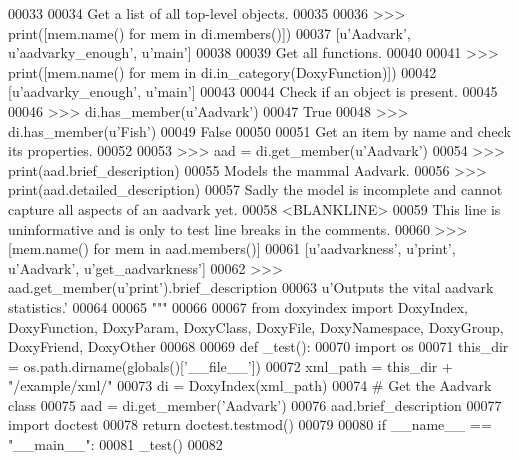 \begin{DoxyCode}
00033 \textcolor{stringliteral}{}
00034 \textcolor{stringliteral}{Get a list of all top-level objects.}
00035 \textcolor{stringliteral}{}
00036 \textcolor{stringliteral}{>>> print([mem.name() for mem in di.members()])}
00037 \textcolor{stringliteral}{[u'Aadvark', u'aadvarky\_enough', u'main']}
00038 \textcolor{stringliteral}{}
00039 \textcolor{stringliteral}{Get all functions.}
00040 \textcolor{stringliteral}{}
00041 \textcolor{stringliteral}{>>> print([mem.name() for mem in di.in\_category(DoxyFunction)])}
00042 \textcolor{stringliteral}{[u'aadvarky\_enough', u'main']}
00043 \textcolor{stringliteral}{}
00044 \textcolor{stringliteral}{Check if an object is present.}
00045 \textcolor{stringliteral}{}
00046 \textcolor{stringliteral}{>>> di.has\_member(u'Aadvark')}
00047 \textcolor{stringliteral}{True}
00048 \textcolor{stringliteral}{>>> di.has\_member(u'Fish')}
00049 \textcolor{stringliteral}{False}
00050 \textcolor{stringliteral}{}
00051 \textcolor{stringliteral}{Get an item by name and check its properties.}
00052 \textcolor{stringliteral}{}
00053 \textcolor{stringliteral}{>>> aad = di.get\_member(u'Aadvark')}
00054 \textcolor{stringliteral}{>>> print(aad.brief\_description)}
00055 \textcolor{stringliteral}{Models the mammal Aadvark.}
00056 \textcolor{stringliteral}{>>> print(aad.detailed\_description)}
00057 \textcolor{stringliteral}{Sadly the model is incomplete and cannot capture all aspects of an aadvark yet.}
00058 \textcolor{stringliteral}{<BLANKLINE>}
00059 \textcolor{stringliteral}{This line is uninformative and is only to test line breaks in the comments.}
00060 \textcolor{stringliteral}{>>> [mem.name() for mem in aad.members()]}
00061 \textcolor{stringliteral}{[u'aadvarkness', u'print', u'Aadvark', u'get\_aadvarkness']}
00062 \textcolor{stringliteral}{>>> aad.get\_member(u'print').brief\_description}
00063 \textcolor{stringliteral}{u'Outputs the vital aadvark statistics.'}
00064 \textcolor{stringliteral}{}
00065 \textcolor{stringliteral}{"""}
00066 
00067 \textcolor{keyword}{from} doxyindex \textcolor{keyword}{import} DoxyIndex, DoxyFunction, DoxyParam, DoxyClass, DoxyFile, DoxyNamespace, DoxyGroup, 
      DoxyFriend, DoxyOther
00068 
00069 \textcolor{keyword}{def }_test():
00070     \textcolor{keyword}{import} os
00071     this\_dir = os.path.dirname(globals()[\textcolor{stringliteral}{'\_\_file\_\_'}])
00072     xml\_path = this\_dir + \textcolor{stringliteral}{"/example/xml/"}
00073     di = DoxyIndex(xml\_path)
00074     \textcolor{comment}{# Get the Aadvark class}
00075     aad = di.get\_member(\textcolor{stringliteral}{'Aadvark'})
00076     aad.brief\_description
00077     \textcolor{keyword}{import} doctest
00078     \textcolor{keywordflow}{return} doctest.testmod()
00079 
00080 \textcolor{keywordflow}{if} \_\_name\_\_ == \textcolor{stringliteral}{"\_\_main\_\_"}:
00081     _test()
00082 
\end{DoxyCode}
